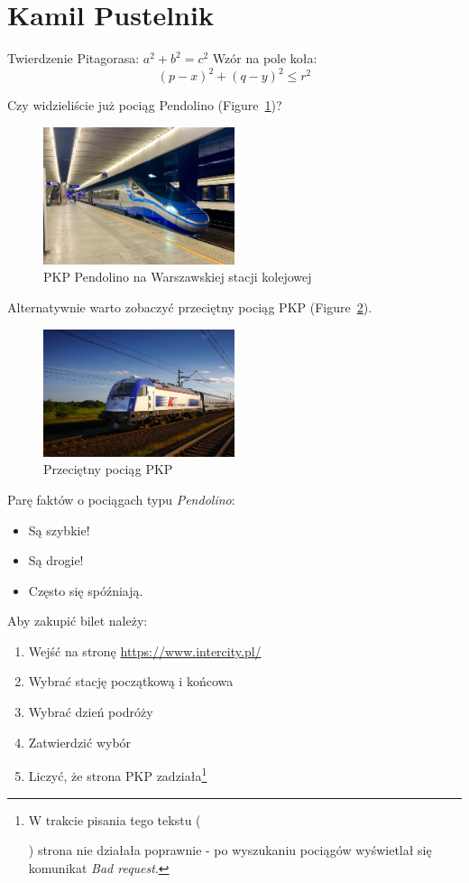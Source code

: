 \section{Kamil Pustelnik}
\label{sec:kpust}

Twierdzenie Pitagorasa: $a^2 + b^2 = c^2$
Wzór na pole koła: \[(p - x)^2 + (q - y)^2 \leq r^2\]

Czy widzieliście już pociąg Pendolino (Figure~\ref{fig:pendolino})?

\begin{figure}[htbp]
    \centering
    \label{fig:pendolino}
    \includegraphics[width=0.5\textwidth]{pictures/Pendolino.jpg}
    \caption{PKP Pendolino na Warszawskiej stacji kolejowej}
\end{figure}

Alternatywnie warto zobaczyć przeciętny pociąg PKP (Figure~\ref{fig:pociag_pkp}).

\begin{figure}[htbp]
    \centering
    \label{fig:pociag_pkp}
    \includegraphics[width=0.5\textwidth]{pictures/pociag_pkp.jpg}
    \caption{Przeciętny pociąg PKP}
\end{figure}

Parę faktów o pociągach typu \emph{Pendolino}:
\begin{itemize}
    \item Są szybkie!
    \item Są drogie!
    \item Często się spóźniają.
\end{itemize}

Aby zakupić bilet należy:
\begin{enumerate}
    \item Wejść na stronę \url{https://www.intercity.pl/}
    \item Wybrać stację początkową i końcowa
    \item Wybrać dzień podróży
    \item Zatwierdzić wybór
    \item Liczyć, że strona PKP zadziała\footnote{W trakcie pisania tego tekstu (\date{25.10.2023}) strona nie działała poprawnie - po wyszukaniu pociągów wyświetlał się komunikat \emph{Bad request}.}
\end{enumerate}


